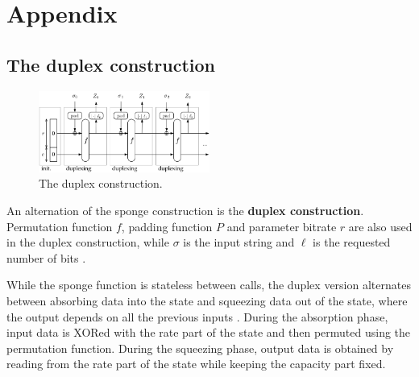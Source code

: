 \section{Appendix}

\subsection{The duplex construction}

\begin{figure}[htbp]
  \centering
  \includegraphics[width=0.5\textwidth]{images/Duplex-150.png}
  \caption{The duplex construction.}
  \label{fig:duplex}
\end{figure}

An alternation of the sponge construction is the \textbf{duplex construction}. Permutation function $f$, padding function $P$ and parameter bitrate $r$ are also used in the duplex construction, while $\sigma$ is the input string and $\ell$ is the requested number of bits \cite{keccak_team,sponge_function_2023,guido_b_d_michaël_p_2011}. \par 

While the sponge function is stateless between calls, the duplex version alternates between absorbing data into the state and squeezing data out of the state, where the output depends on all the previous inputs \cite{guido_b_d_michaël_p_2011,cryptoeprint:2023/796}. During the absorption phase, input data is XORed with the rate part of the state and then permuted using the permutation function. During the squeezing phase, output data is obtained by reading from the rate part of the state while keeping the capacity part fixed. \par